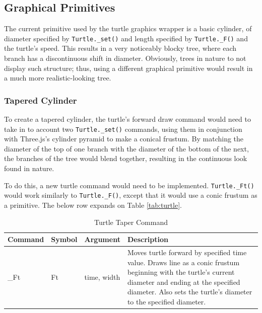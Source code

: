 \documentclass{article}
\newcommand{\tab}{\hspace*{2em}}
\begin{document}
        \subsection{Graphical Primitives}
    \tab The current primitive used by the turtle graphics wrapper is a basic cylinder, of diameter
specified by \verb|Turtle._set()| and length specified by \verb|Turtle._F()| and the turtle's
speed. This results in a very noticeably blocky tree, where each branch has a discontinuous shift
in diameter. Obviously, trees in nature to not display such structure; thus, using a different
graphical primitive would result in a much more realistic-looking tree.

            \subsubsection{Tapered Cylinder}
    \tab To create a tapered cylinder, the turtle's forward draw command would need to take in to
account two \verb|Turtle._set()| commands, using them in conjunction with Three.js's cylinder
pyramid to make a conical frustum. By matching the diameter of the top of one branch with the
diameter of the bottom of the next, the branches of the tree would blend together, resulting in the
continuous look found in nature.

    \tab To do this, a new turtle command would need to be implemented. \verb|Turtle._Ft()| would
work similarly to \verb|Turtle._F()|, except that it would use a conic frustum as a primitive. The below row
expands on Table \ref{tab:turtle}.
\begin{table}[h]
\centering
\begin{tabular}{|l|l|l|p{7cm}|}
    \hline
    Command & Symbol & Argument & Description \\ \hline \hline
    \_Ft & Ft & time, width & Moves turtle forward by specified time value. Draws line as a conic
frustum beginning with the turtle's current diameter and ending at the specified diameter. Also
sets the turtle's diameter to the specified diameter.\\ \hline
\end{tabular}
\caption[Taper Command]{Turtle Taper Command}
\label{tab:taper}
\end{table}
\end{document}
